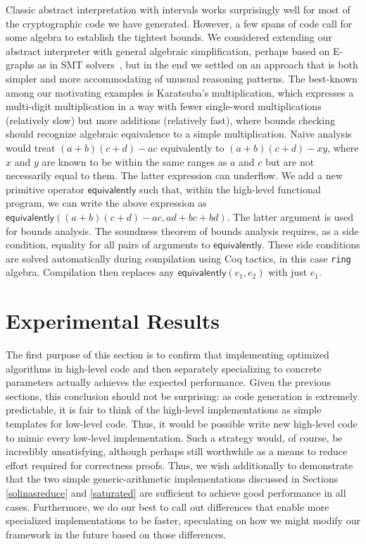 \documentclass[conference,letterpaper]{IEEEtran}
\begin{document}
Classic abstract interpretation with intervals works surprisingly well for most of the cryptographic code we have generated.
However, a few spans of code call for some algebra to establish the tightest bounds.
We considered extending our abstract interpreter with general algebraic simplification, perhaps based on E-graphs as in SMT solvers~\cite{simplify}, but in the end we settled on an approach that is both simpler and more accommodating of unusual reasoning patterns.
The best-known among our motivating examples is Karatsuba's multiplication, which expresses a multi-digit multiplication in a way with fewer single-word multiplications (relatively slow) but more additions (relatively fast), where bounds checking should recognize algebraic equivalence to a simple multiplication.
Naive analysis would treat $(a + b)(c+d) - ac$ equivalently to $(a+b)(c+d) - xy$, where $x$ and $y$ are known to be within the same ranges as $a$ and $c$ but are not necessarily equal to them. The latter expression can underflow.
We add a new primitive operator $\mathsf{equivalently}$ such that, within the high-level functional program, we can write the above expression as $\mathsf{equivalently}\left((a+b)(c+d)-ac, ad+bc+bd\right)$.
The latter argument is used for bounds analysis.
The soundness theorem of bounds analysis requires, as a side condition, equality for all pairs of arguments to $\mathsf{equivalently}$.
These side conditions are solved automatically during compilation using Coq tactics, in this case \texttt{ring} algebra.
Compilation then replaces any $\mathsf{equivalently}\left(e_1, e_2\right)$ with just $e_1$.

\section{Experimental Results}\label{experiments}

The first purpose of this section is to confirm that implementing optimized algorithms in high-level code and then separately specializing to concrete parameters actually achieves the expected performance.
Given the previous sections, this conclusion should not be surprising: as code generation is extremely predictable, it is fair to think of the high-level implementations as simple templates for low-level code.
Thus, it would be possible write new high-level code to mimic every low-level implementation.
Such a strategy would, of course, be incredibly unsatisfying, although perhaps still worthwhile as a means to reduce effort required for correctness proofs.
Thus, we wish additionally to demonstrate that the two simple generic-arithmetic implementations discussed in Sections \ref{solinasreduce} and \ref{saturated} are sufficient to achieve good performance in all cases.
Furthermore, we do our best to call out differences that enable more specialized implementations to be faster, speculating on how we might modify our framework in the future based on those differences.
\end{document}
